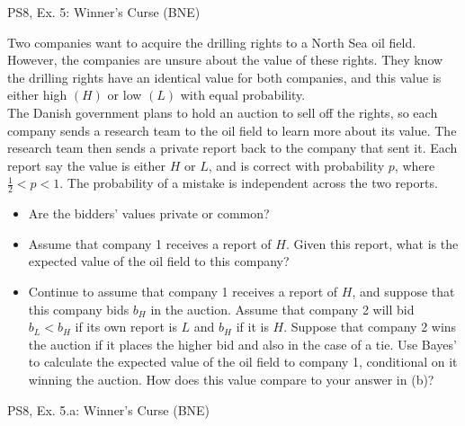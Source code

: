 \begin{frame}{PS8, Ex. 5: Winner's Curse (BNE)}
  \begin{multicols}{2}
    Two companies want to acquire the drilling rights to a North Sea oil field. However, the companies are unsure about the value of these rights. They know the drilling rights have an identical value for both companies, and this value is either high $(H)$ or low $(L)$ with equal probability.\\\medskip
    The Danish government plans to hold an auction to sell off the rights, so each company sends a research team to the oil field to learn more about its value. The research team then sends a private report back to the company that sent it. Each report say the value is either $H$ or $L$, and is correct with probability $p$, where $\frac{1}{2} < p < 1$. The probability of a mistake is independent across the two reports.
    \vfill\null\columnbreak
    \begin{itemize}
      \item[(a)] Are the bidders’ values private or common?
      \item[(b)] Assume that company 1 receives a report of $H$. Given this report, what is the expected value of the oil field to this company?
      \item[(b)] Continue to assume that company 1 receives a report of $H$, and suppose that this company bids $b_H$ in the auction. Assume that company 2 will bid $b_L < b_H$ if its own report is $L$ and $b_H$ if it is $H$. Suppose that company 2 wins the auction if it places the higher bid and also in the case of a tie. Use Bayes’ to calculate the expected value of the oil field to company 1, conditional on it winning the auction. How does this value compare to your answer in (b)?
    \end{itemize}
    \vfill
  \end{multicols}
\end{frame}

\begin{frame}{PS8, Ex. 5.a: Winner's Curse (BNE)}
  \begin{multicols}{2}
    \vfill\null\columnbreak
    \vfill\null
  \end{multicols}
\end{frame}

